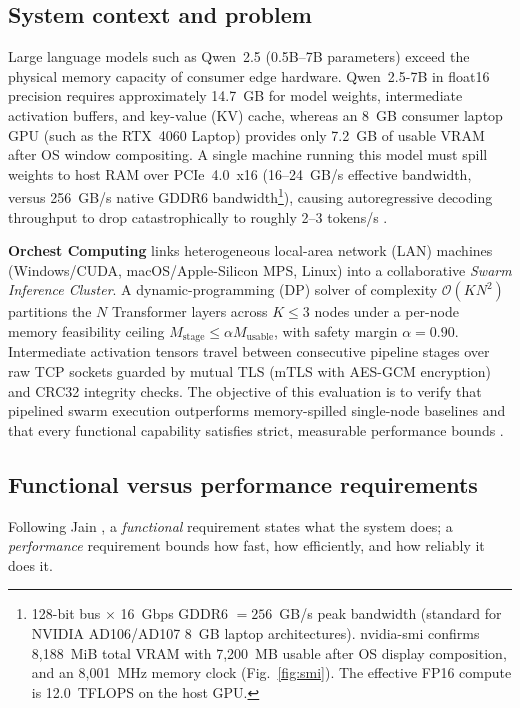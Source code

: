 \documentclass[10pt,a4paper]{article}
\newcommand{\code}[1]{{\ttfamily\footnotesize #1}}
\begin{document}
\subsection{System context and problem}
Large language models such as Qwen~2.5 (0.5B--7B parameters) \cite{qwen} exceed the physical memory capacity of consumer edge hardware. Qwen~2.5-7B in float16 precision requires approximately 14.7~GB for model weights, intermediate activation buffers, and key-value (KV) cache, whereas an 8~GB consumer laptop GPU (such as the RTX~4060 Laptop) provides only 7.2~GB of usable VRAM after OS window compositing. A single machine running this model must spill weights to host RAM over PCIe~4.0~x16 (16--24~GB/s effective bandwidth, versus 256~GB/s native GDDR6 bandwidth\footnote{128-bit bus $\times$ 16~Gbps GDDR6 $=256$~GB/s peak bandwidth (standard for NVIDIA AD106/AD107 8~GB laptop architectures). \code{nvidia-smi} confirms 8{,}188~MiB total VRAM with 7{,}200~MB usable after OS display composition, and an 8{,}001~MHz memory clock (Fig.~\ref{fig:smi}). The effective FP16 compute is 12.0~TFLOPS on the host GPU.}), causing autoregressive decoding throughput to drop catastrophically to roughly 2--3 tokens/s \cite{roofline}.

\textbf{Orchest Computing} links heterogeneous local-area network (LAN) machines (Windows/CUDA, macOS/Apple-Silicon MPS, Linux) into a collaborative \emph{Swarm Inference Cluster}. A dynamic-programming (DP) solver of complexity $\mathcal{O}(KN^2)$ partitions the $N$ Transformer layers \cite{attention} across $K\le 3$ nodes under a per-node memory feasibility ceiling $M_{\text{stage}}\le\alpha M_{\text{usable}}$, with safety margin $\alpha=0.90$. Intermediate activation tensors travel between consecutive pipeline stages over raw TCP sockets guarded by mutual TLS (mTLS with AES-GCM encryption) and CRC32 integrity checks. The objective of this evaluation is to verify that pipelined swarm execution outperforms memory-spilled single-node baselines and that every functional capability satisfies strict, measurable performance bounds \cite{jain}.

\subsection{Functional versus performance requirements}
Following Jain \cite{jain}, a \emph{functional} requirement states what the system does; a \emph{performance} requirement bounds how fast, how efficiently, and how reliably it does it.
\end{document}
